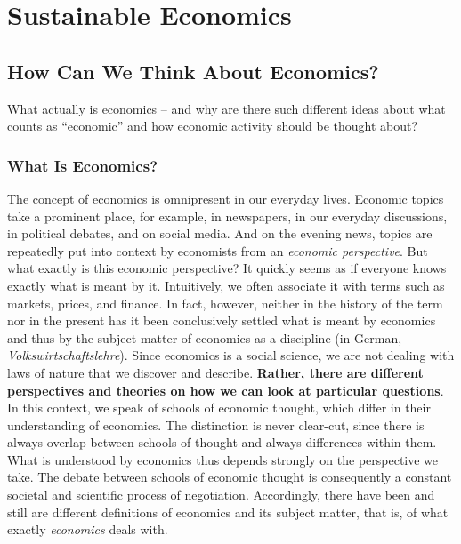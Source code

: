 \documentclass[
  british,
  a4paper,
  DIV=11,
  numbers=noendperiod,
  oneside,
  openany]{scrreprt}
\begin{document}
\part{Sustainable Economics}

\chapter{How Can We Think About
Economics?}\label{how-can-we-think-about-economics}

\begin{tcolorbox}[enhanced jigsaw, arc=.35mm, bottomrule=.15mm, bottomtitle=1mm, breakable, colback=white, colbacktitle=quarto-callout-note-color!10!white, colframe=quarto-callout-note-color-frame, coltitle=black, left=2mm, leftrule=.75mm, opacityback=0, opacitybacktitle=0.6, rightrule=.15mm, title={Guiding question}, titlerule=0mm, toprule=.15mm, toptitle=1mm]

What actually is economics -- and why are there such different ideas
about what counts as ``economic'' and how economic activity should be
thought about?

\end{tcolorbox}

\section{What Is Economics?}\label{what-is-economics}

The concept of economics is omnipresent in our everyday lives. Economic
topics take a prominent place, for example, in newspapers, in our
everyday discussions, in political debates, and on social media. And on
the evening news, topics are repeatedly put into context by economists
from an \emph{economic perspective}. But what exactly is this economic
perspective? It quickly seems as if everyone knows exactly what is meant
by it. Intuitively, we often associate it with terms such as markets,
prices, and finance. In fact, however, neither in the history of the
term nor in the present has it been conclusively settled what is meant
by economics and thus by the subject matter of economics as a discipline
(in German, \emph{Volkswirtschaftslehre}). Since economics is a social
science, we are not dealing with laws of nature that we discover and
describe. \textbf{Rather, there are different perspectives and theories
on how we can look at particular questions}. In this context, we speak
of schools of economic thought, which differ in their understanding of
economics. The distinction is never clear-cut, since there is always
overlap between schools of thought and always differences within them.
What is understood by economics thus depends strongly on the perspective
we take. The debate between schools of economic thought is consequently
a constant societal and scientific process of negotiation. Accordingly,
there have been and still are different definitions of economics and its
subject matter, that is, of what exactly \emph{economics} deals with.
\end{document}
